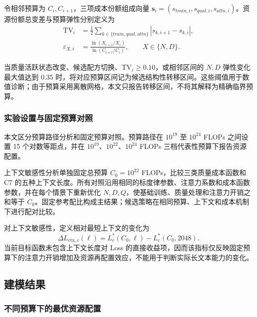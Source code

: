\documentclass[bwprint]{gmcmthesis}
\numberwithin{equation}{section}
\numberwithin{figure}{section}
\numberwithin{table}{section}
\begin{document}
        令相邻预算为 $C_i,C_{i+1}$，三项成本份额组成向量 $\bm s_i=(s_{train,i},s_{qual,i},s_{attn,i})$。资源份额总变差与预算弹性分别定义为
        \begin{equation}
        \begin{aligned}
        \mathrm{TV}_i
        &=\frac12\sum_{k\in\{train,qual,attn\}}|s_{k,i+1}-s_{k,i}|,\\
        \varepsilon_{X,i}
        &=\frac{\ln(X_{i+1}/X_i)}{\ln(C_{i+1}/C_i)},
        \qquad X\in\{N,D\}.
        \end{aligned}
        \label{eq:p3_transition_indicators}
        \end{equation}

        当质量活跃状态改变、候选配方切换、$\mathrm{TV}_i\ge0.10$，或相邻区间的 $N,D$ 弹性变化最大值达到 $0.35$ 时，将对应预算区间记为候选结构性转移区间。这些阈值用于数值诊断；由于预算采用离散网格，本文只报告转移区间，不将其解释为精确临界预算。

        \subsubsection{实验设置与固定预算对照}

        本文区分预算路径分析和固定预算对照。预算路径在 $10^{19}$ 至 $10^{24}$ FLOPs 之间设置 15 个对数等距点，并在 $10^{19}$、$10^{22}$、$10^{24}$ FLOPs 三档代表性预算下报告资源配置。

        上下文敏感性分析单独固定总预算 $C_0=10^{22}$ FLOPs，比较三类质量成本函数和 C7 的五种上下文长度。所有对照沿用相同的标度律参数、注意力系数和成本函数参数，并在每个情景下重新优化 $N,D,Q$，使基础训练、质量处理和注意力开销之和等于 $C_0$。固定参考配比构成主结果；候选策略在相同预算、上下文和成本机制下进行配对比较。

        对上下文敏感性，定义相对最短上下文的变化为
        \begin{equation}
        \Delta L_{\mathrm{ctx},c}(\ell)
        =L_c^*(C_0,\ell)-L_c^*(C_0,2048).
        \label{eq:p3_context_loss_change}
        \end{equation}
        当前目标函数未包含上下文长度对 Loss 的直接收益项，因而该指标仅反映固定预算下的注意力开销增加及资源再配置效应，不能用于判断实际长文本能力的变化。

    \subsection{建模结果}

        \subsubsection{不同预算下的最优资源配置}
\end{document}

